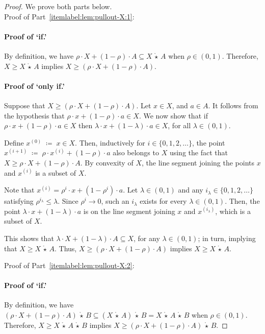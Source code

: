 \documentclass[10pt]{amsart}
\theoremstyle{plain}
\theoremstyle{definition}
\let\leq\leqslant
\let\geq\geqslant
\providecommand{\defeq}[0]{\ensuremath{\;\coloneqq\;}\xspace}
\providecommand{\p}[1]{\ensuremath{^{\left(#1\right)}}\xspace}
\providecommand{\cmult}[0]{\ensuremath{{\,\mathring{\star}\,}}\xspace}
\begin{document}
\begin{proof}
We prove both parts below. \\

\noindent
Proof of Part~\eqref{itemlabel:lem:pullout-X:1}: 
\paragraph{Proof of `if.'} By definition, we have 
$\rho\cdot X+(1-\rho)\cdot A\subseteq X\cmult A$ when 
$\rho\in (0,1)$. Therefore, $X\geq X\cmult A$ implies 
$X\geq (\rho\cdot X + (1-\rho)\cdot A)$. 

\paragraph{Proof of `only if.'} Suppose that $X\geq (\rho\cdot X + (1-\rho)\cdot A)$. Let $x\in X$, and $a\in A$. It follows from the hypothesis that $\rho\cdot x+(1-\rho)\cdot a\in X$.
 We now show that if $\rho\cdot x+(1-\rho)\cdot a\in X$ then $\lambda\cdot x+(1-\lambda)\cdot a\in X$, for all $\lambda\in (0,1)$.

Define $x\p 0 \defeq x \in X$. 
    Then, inductively for $i\in\{0,1,2,\dotsc\}$, the point $x\p{i+1} \defeq \rho\cdot x\p i + (1-\rho)\cdot a$ also belongs to $X$ using the fact that $X \geq \rho\cdot X + (1-\rho)\cdot A$.
    By convexity of $X$, the line segment joining the points $x$ and $x\p i$ is a subset of $X$. 
    
    Note that $x\p i = \rho^i\cdot x + (1-\rho^i)\cdot a$. 
    Let $\lambda\in(0,1)$ and any $i_\lambda\in\{0,1,2,\dotsc\}$ satisfying 
    $\rho^{i_\lambda} \leq \lambda$.
    Since $\rho^i \rightarrow 0$, such an $i_\lambda$ exists for every
    $\lambda \in (0,1)$.
    Then, the point $\lambda\cdot x  +(1-\lambda)\cdot a$ is on the line segment joining $x$ and $x\p{i_\lambda}$, which is a subset of $X$.

    This shows  that $\lambda\cdot X+(1-\lambda)\cdot A\subseteq X$, for any $\lambda\in (0,1)$; in turn, implying that $X\geq X\cmult A$. 
    Thus, $X\geq (\rho\cdot X + (1-\rho)\cdot A)$ implies $X\geq X\cmult A$.

\medskip
\noindent
Proof of Part~\eqref{itemlabel:lem:pullout-X:2}:
\paragraph{Proof of `if.'} By definition, we have 
$\left(\rho\cdot X+(1-\rho)\cdot A\right)\cmult B\subseteq \left(X\cmult A\right) \cmult B= X\cmult A\cmult B$ when $\rho\in (0,1)$. Therefore, $X\geq X\cmult A\cmult B$ implies $X\geq (\rho\cdot X+(1-\rho)\cdot A)\cmult B$. 


\end{proof}
\end{document}
